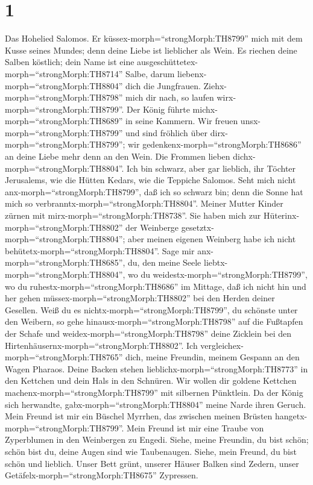 \hypertarget{section}{%
\section{1}\label{section}}

 Das Hohelied Salomos.  Er
küssex-morph=``strongMorph:TH8799'' mich mit dem Kusse seines Mundes;
denn deine Liebe ist lieblicher als Wein.  Es riechen deine
Salben köstlich; dein Name ist eine
ausgeschüttetex-morph=``strongMorph:TH8714'' Salbe, darum
liebenx-morph=``strongMorph:TH8804'' dich die Jungfrauen. 
Ziehx-morph=``strongMorph:TH8798'' mich dir nach, so laufen
wirx-morph=``strongMorph:TH8799''. Der König führte
michx-morph=``strongMorph:TH8689'' in seine Kammern. Wir freuen
unsx-morph=``strongMorph:TH8799'' und sind fröhlich über
dirx-morph=``strongMorph:TH8799''; wir
gedenkenx-morph=``strongMorph:TH8686'' an deine Liebe mehr denn an den
Wein. Die Frommen lieben dichx-morph=``strongMorph:TH8804''.
 Ich bin schwarz, aber gar lieblich, ihr Töchter Jerusalems,
wie die Hütten Kedars, wie die Teppiche Salomos.  Seht mich
nicht anx-morph=``strongMorph:TH8799'', daß ich so schwarz bin; denn die
Sonne hat mich so verbranntx-morph=``strongMorph:TH8804''. Meiner Mutter
Kinder zürnen mit mirx-morph=``strongMorph:TH8738''. Sie haben mich zur
Hüterinx-morph=``strongMorph:TH8802'' der Weinberge
gesetztx-morph=``strongMorph:TH8804''; aber meinen eigenen Weinberg habe
ich nicht behütetx-morph=``strongMorph:TH8804''.  Sage mir
anx-morph=``strongMorph:TH8685'', du, den meine Seele
liebtx-morph=``strongMorph:TH8804'', wo du
weidestx-morph=``strongMorph:TH8799'', wo du
ruhestx-morph=``strongMorph:TH8686'' im Mittage, daß ich nicht hin und
her gehen müssex-morph=``strongMorph:TH8802'' bei den Herden deiner
Gesellen.  Weiß du es nichtx-morph=``strongMorph:TH8799'',
du schönste unter den Weibern, so gehe
hinausx-morph=``strongMorph:TH8798'' auf die Fußtapfen der Schafe und
weidex-morph=``strongMorph:TH8798'' deine Zicklein bei den
Hirtenhäusernx-morph=``strongMorph:TH8802''.  Ich
vergleichex-morph=``strongMorph:TH8765'' dich, meine Freundin, meinem
Gespann an den Wagen Pharaos.  Deine Backen stehen
lieblichx-morph=``strongMorph:TH8773'' in den Kettchen und dein Hals in
den Schnüren.  Wir wollen dir goldene Kettchen
machenx-morph=``strongMorph:TH8799'' mit silbernen Pünktlein.
 Da der König sich herwandte,
gabx-morph=``strongMorph:TH8804'' meine Narde ihren Geruch.
 Mein Freund ist mir ein Büschel Myrrhen, das zwischen
meinen Brüsten hangetx-morph=``strongMorph:TH8799''.  Mein
Freund ist mir eine Traube von Zyperblumen in den Weinbergen zu Engedi.
 Siehe, meine Freundin, du bist schön; schön bist du, deine
Augen sind wie Taubenaugen.  Siehe, mein Freund, du bist
schön und lieblich. Unser Bett grünt,  unserer Häuser
Balken sind Zedern, unser Getäfelx-morph=``strongMorph:TH8675''
Zypressen.

